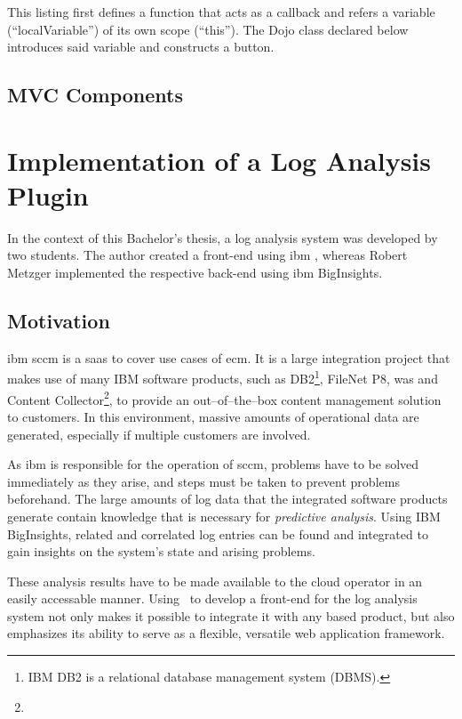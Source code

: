This listing first defines a function that acts as a callback and refers a variable (``localVariable'') of its own scope (``this''). The Dojo class declared below introduces said variable and constructs a button.

\subsection{MVC Components}


\section{Implementation of a Log Analysis Plugin}
\label{sec:loganal}
In the context of this Bachelor's thesis, a log analysis system was developed by two students. The author created a front-end using \ac{ibm} \nexus, whereas Robert Metzger implemented the respective back-end using \ac{ibm} BigInsights.
\subsection{Motivation}
\ac{ibm} \acl{sccm} is a \acl{saas} to cover use cases of \acl{ecm}. It is a large integration project that makes use of many IBM software products, such as DB2\footnote{IBM DB2 is a relational database management system (DBMS).}, FileNet P8, \acl{was} and Content Collector\footnote{}, to provide an out--of--the--box content management solution to customers. In this environment, massive amounts of operational data are generated, especially if multiple customers are involved.

As \ac{ibm} is responsible for the operation of \ac{sccm}, problems have to be solved immediately as they arise, and steps must be taken to prevent problems beforehand. The large amounts of log data that the integrated software products generate contain knowledge that is necessary for \emph{predictive analysis}. Using IBM BigInsights, related and correlated log entries can be found and integrated to gain insights on the system's state and arising problems. %

These analysis results have to be made available to the cloud operator in an easily accessable manner. Using \nexus\ to develop a front-end for the log analysis system not only makes it possible to integrate it with any \nexus based product, but also emphasizes its ability to serve as a flexible, versatile web application framework.

